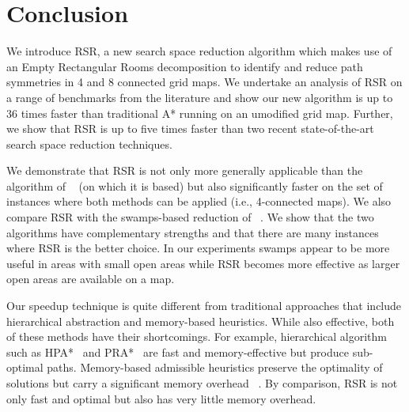 \section{Conclusion}
We introduce RSR, a new search space reduction algorithm
which makes use of an Empty Rectangular Rooms decomposition
to identify and reduce path symmetries in 4 and 8 connected
grid maps.
We undertake an analysis of RSR on a range of benchmarks from the
literature and show our new algorithm is up to 36 times faster than
traditional A* running on an umodified grid map.
Further, we show that RSR is up to five times faster than two recent
state-of-the-art search space reduction techniques.
\par
We demonstrate that RSR is not only more generally applicable
than the algorithm of \citeauthor{harabor10}~ 
(on which it is based) but also significantly faster on the set of 
instances where both methods can be applied (i.e., 4-connected maps).
We also compare RSR with the swamps-based reduction
of \citeauthor{pochter10}~.
We show that the two algorithms have complementary strengths and that there are many
instances where RSR is the better choice.
In our experiments swamps appear to be more useful in areas with small open areas
while RSR becomes more effective as larger open areas are available on a map.
\par
Our speedup technique is quite different from traditional approaches 
that include hierarchical abstraction and memory-based heuristics.
While also effective, both of these methods have their shortcomings.
For example, hierarchical algorithm such as HPA*~\cite{botea04} and 
PRA*~\cite{sturtevant07} are fast and memory-effective but produce 
sub-optimal paths.
Memory-based admissible heuristics preserve the optimality of 
solutions but carry a significant memory overhead~
\cite{sturtevant09,goldberg05,Cazenave:06,bjornsson06}.
By comparison, RSR is not only fast and optimal but also has very little
memory overhead.



